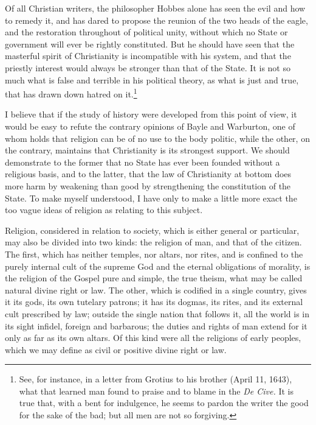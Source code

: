\documentclass[12pt]{book}
\begin{document}
Of all Christian writers, the philosopher Hobbes alone has seen the evil and how to remedy it, and has dared to propose the reunion of the two heads of the eagle, and the restoration throughout of political unity, without which no State or government will ever be rightly constituted. But he should have seen that the masterful spirit of Christianity is incompatible with his system, and that the priestly interest would always be stronger than that of the State. It is not so much what is false and terrible in his political theory, as what is just and true, that has drawn down hatred on it.\footnote{See, for instance, in a letter from Grotius to his brother (April 11, 1643), what that learned man found to praise and to blame in the \textit{De Cive.} It is true that, with a bent for indulgence, he seems to pardon the writer the good for the sake of the bad; but all men are not so forgiving.}

I believe that if the study of history were developed from this point of view, it would be easy to refute the contrary opinions of Bayle and Warburton, one of whom holds that religion can be of no use to the body politic, while the other, on the contrary, maintains that Christianity is its strongest support. We should demonstrate to the former that no State has ever been founded without a religious basis, and to the latter, that the law of Christianity at bottom does more harm by weakening than good by strengthening the constitution of the State. To make myself understood, I have only to make a little more exact the too vague ideas of religion as relating to this subject.

Religion, considered in relation to society, which is either general or particular, may also be divided into two kinds: the religion of man, and that of the citizen. The first, which has neither temples, nor altars, nor rites, and is confined to the purely internal cult of the supreme God and the eternal obligations of morality, is the religion of the Gospel pure and simple, the true theism, what may be called natural divine right or law. The other, which is codified in a single country, gives it its gods, its own tutelary patrons; it has its dogmas, its rites, and its external cult prescribed by law; outside the single nation that follows it, all the world is in its sight infidel, foreign and barbarous; the duties and rights of man extend for it only as far as its own altars. Of this kind were all the religions of early peoples, which we may define as civil or positive divine right or law.
\end{document}
